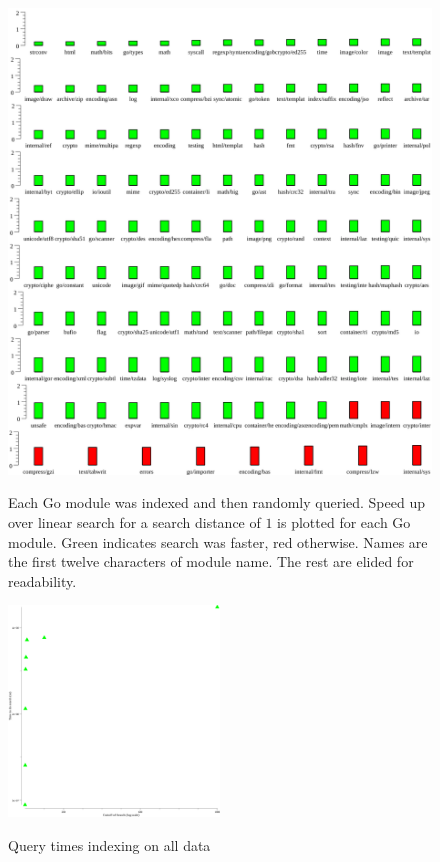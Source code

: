 \begin{figure}
    \includegraphics[width=\textwidth]{example1.png}
    \label{dist1plot}
    \centering
    \caption{Each Go module was indexed and then randomly queried.
    Speed up over linear search for a search distance of $1$ is plotted for each Go module.
    Green indicates search was faster, red otherwise.
    Names are the first twelve characters of module name.
    The rest are elided for readability.}
\end{figure}
\begin{figure}
    \includegraphics[width=0.5\textwidth]{alldat.png}
    \label{allplot}
    \centering 
    \caption{Query times indexing on all data}
\end{figure}